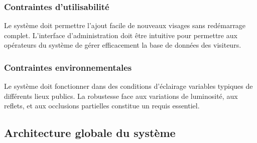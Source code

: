 \documentclass[12pt,a4paper]{article}
\begin{document}
\subsubsection{Contraintes d'utilisabilité}

Le système doit permettre l'ajout facile de nouveaux visages sans redémarrage complet. L'interface d'administration doit être intuitive pour permettre aux opérateurs du système de gérer efficacement la base de données des visiteurs.

\subsubsection{Contraintes environnementales}

Le système doit fonctionner dans des conditions d'éclairage variables typiques de différents lieux publics. La robustesse face aux variations de luminosité, aux reflets, et aux occlusions partielles constitue un requis essentiel.

\subsection{Architecture globale du système}
\end{document}
